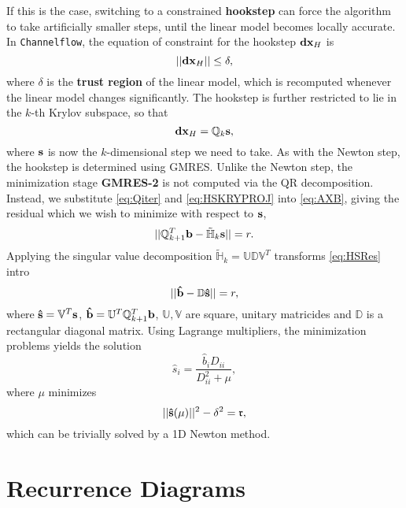  If this is the case, switching to a constrained {\bf hookstep} can force the algorithm to take artificially smaller steps, until the linear model becomes locally accurate. In {\tt Channelflow}, the equation of constraint for the hookstep $\mathbf{dx}_H$ is 
 \begin{equation}\label{eq:HSEOC}
 ||\mathbf{dx}_H|| \leq \delta,
 \end{equation}
 where $\delta$ is the {\bf trust region} of the linear model, which is recomputed whenever the linear model changes significantly. The hookstep is further restricted to lie in the $k$-th Krylov subspace, so that 
 \begin{equation}\label{eq:HSKRYPROJ}
 \mathbf{dx}_H = \mathbb{Q}_{k}\mathbf{s},
 \end{equation} 
 where $\mathbf{s}$ is now the $k$-dimensional step we need to take. As with the Newton step, the hookstep is determined using GMRES. Unlike the Newton step, the minimization stage  {\bf GMRES-2} is not computed via the QR decomposition. Instead, we substitute \eqref{eq:Qiter} and \eqref{eq:HSKRYPROJ} into \eqref{eq:AXB}, giving the residual which we wish to minimize with respect to $\mathbf{s}$,
 \begin{equation}\label{eq:HSRes}
 ||\mathbb{Q}^{T}_{k+1}\mathbf{b}-\mathbb{\tilde{H}}_k\mathbf{s}|| = r.
 \end{equation}
 Applying the singular value decomposition $\mathbb{\tilde{H}}_k = \mathbb{U}\mathbb{D}\mathbb{V}^T$ transforms \eqref{eq:HSRes} intro
 \begin{equation}
 || \mathbf{\hat{b}}-\mathbb{D}\mathbf{\hat{s}} || = r,
 \end{equation}
 where $\mathbf{\hat{s}} = \mathbb{V}^T\mathbf{s}$, $\mathbf{\hat{b}} = \mathbb{U}^T\mathbb{Q}^T_{k+1}\mathbf{b}$, $\mathbb{U},\mathbb{V}$ are square, unitary matricides and $\mathbb{D}$ is a rectangular diagonal matrix. Using Lagrange multipliers, the minimization problems yields the solution
 \begin{equation}
 {\hat{s}}_i = \frac{{\hat{b}}_i {D}_{ii}}{{D}_{ii}^2 + \mu},
 \end{equation}
 where $\mu$ minimizes 
 \begin{equation}
 ||\mathbf{\hat{s}}(\mu)||^2 - \delta^2 = \mathfrak{r},
 \end{equation}
 which can be trivially solved by a 1D Newton method. 
 
 \section{Recurrence Diagrams}
 
